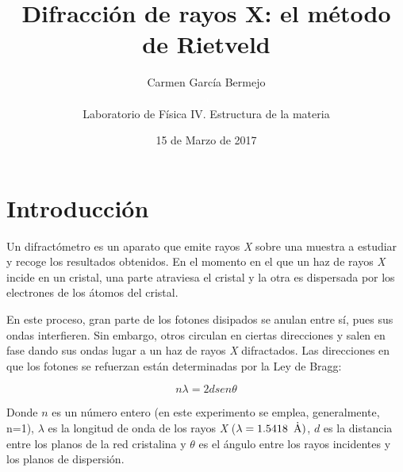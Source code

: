 \documentclass[a4paper,twocolumn,10pt]{article}
\begin{document}
 \title{\textbf{Difracción de rayos X: el método de Rietveld }}
\author{\large{Carmen García Bermejo}\\ 
\textcolor{white}{a}\\
\normalsize Laboratorio de Física IV. Estructura de la materia}
\date{15 de Marzo de 2017} 







\section{Introducción} 




Un difractómetro es un aparato que emite rayos \textit{X} sobre una muestra a estudiar y recoge los resultados obtenidos. En el momento en el que un haz de rayos \textit{X} incide en un cristal, una parte atraviesa el cristal y la otra es dispersada por los electrones de los átomos del cristal. 

   En este proceso, gran parte de los fotones disipados se anulan entre sí, pues sus ondas interfieren. Sin embargo, otros circulan en ciertas direcciones y salen en fase dando sus ondas lugar a un haz de rayos \textit{X} difractados. Las direcciones en que los fotones se refuerzan están determinadas por la Ley de Bragg:  
   
\begin{equation}
n\lambda = 2dsen\theta  
\end{equation}


Donde $n$ es un número entero (en este experimento se emplea, generalmente, n=1), $\lambda$ es la longitud de onda de los rayos \textit{X} ($\lambda = 1.5418 \rm \textcolor{white}{a} \dot{A})$, $d$ es la distancia entre los planos de la red cristalina y $\theta$ es el ángulo entre los rayos incidentes y los planos de dispersión.
\end{document}
